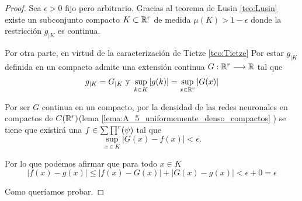 \begin{proof}
    Sea $\epsilon > 0$ fijo pero arbitrario.  Gracias al teorema de Lusin \ref{teo:Lusin}
    existe un subconjunto compacto $K \subset \mathbb{R}^r$ de medida
    $\mu(K) > 1 - \epsilon$ donde la restricción  $g_{|K}$ es continua. 

    Por otra parte, en virtud de la caracterización de Tietze 
    \ref{teo:Tietze} 
    Por estar $g_{|K}$ definida en un compacto admite una 
    extensión continua $G:\mathbb{R}^r \longrightarrow \mathbb{R}$ tal que 
    \begin{equation}
        \begin{split}
            g_{|K} = G_{|K} 
            \text{ y } 
            \sup_{k \in K} |g(k)| 
            = 
            \sup_{x \in \mathbb{R}^r} |G(x)|
        \end{split}
    \end{equation}

    Por ser $G$ continua en un compacto, por la densidad de las redes neuronales en compactos de $C(\mathbb{R}^r)$(lema \ref{lema:A_5_uniformemente_denso_compactos} ) se tiene que existirá 
    una $f \in \sum \prod^r (\psi)$ tal que 
    \begin{equation}
        \sup_{x \in K} |G(x) - f(x)| < \epsilon.
    \end{equation}

    Por lo que podemos afirmar que para todo $x \in K$
    \begin{equation}
        |f(x) -g(x)| 
        \leq 
        | f(x) -G(x)| + |G(x) -g(x)|
        < \epsilon + 0 = \epsilon
    \end{equation}

    Como queríamos probar.
\end{proof}